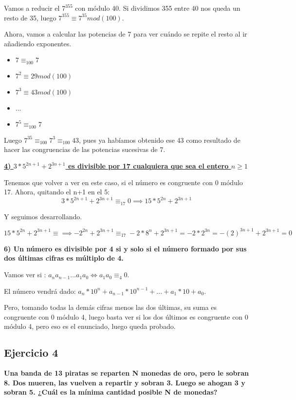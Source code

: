 \documentclass[11pt, a4paper, titlepage]{article}
\begin{document}
Vamos a reducir el $7^{355}$ con módulo 40. Si dividimos 355 entre 40 nos queda un resto de 35, luego $7^{355} \equiv 7^{35} mod(100)$.

Ahora, vamos a calcular las potencias de 7 para ver cuándo se repite el resto al ir añadiendo exponentes.
\begin{itemize}
	\item $7 \equiv_{100} 7$
	\item $7^2 \equiv 29 mod(100)$
	\item $7^3 \equiv 43 mod(100)$
	\item ...
	\item $7^5 \equiv_{100} 7$
\end{itemize}

Luego $7^{35} \equiv_{100} 7^3 \equiv_{100} 43$, pues ya habíamos obtenido ese 43 como resultado de hacer las congruencias de las potencias sucesivas de 7.


\underline{\textbf{4) $3*5^{2n+1} + 2^{3n+1}$ es divisible por 17 cualquiera que sea el entero $n\geq 1$}}

Tenemos que volver a ver en este caso, si el número es congruente con 0 módulo 17.
Ahora, quitando el n+1 en el 5:
\[
3*5^{2n+1} + 2^{3n+1} \equiv_{17} 0  \implies 15*5^{2n} + 2^{3n+1}
\]

Y seguimos desarrollando.

\[
 15*5^{2n} + 2^{3n+1} \equiv  \implies -2^{2n} + 2^{3n+1} \equiv_{17} -2*8^n + 2^{3n+1} = -2*2^{3n} = -(2)^{3n+1} + 2^{3n+1} = 0
\]

\textbf{6) Un número es divisible por 4 si y solo si el número formado por sus dos
últimas cifras es múltiplo de 4.}

Vamos ver si : $a_n a_{n-1}...a_1a_0 \iff a_1 a_0 \equiv_4 0$.

El número vendrá dado: $a_n*10^{n}+ a_{n-1}*10^{n-1} + ... + a_1 * 10 + a_0$.

Pero, tomando todas la demás cifras menos las dos últimas, su suma es congruente con 0 módulo 4, luego  basta ver si los dos últimos es congruente con 0 módulo 4, pero eso es el enunciado, luego queda probado.

\subsection{\LARGE{Ejercicio 4}}
\textbf{Una banda de 13 piratas se reparten N monedas de oro, pero le sobran 8. Dos mueren, las vuelven a repartir y sobran 3. Luego se ahogan 3 y sobran 5. ¿Cuál es la mínima cantidad posible N de monedas?}\\
\end{document}
